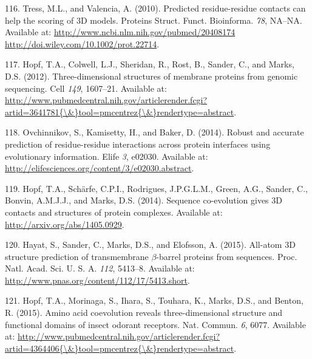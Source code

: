 \documentclass[11pt,a4paper,twoside]{book}
\theoremstyle{definition}
\theoremstyle{definition}
\theoremstyle{remark}
\begin{document}
\hypertarget{ref-Tress2010}{}
116. Tress, M.L., and Valencia, A. (2010). Predicted residue-residue
contacts can help the scoring of 3D models. Proteins Struct. Funct.
Bioinforma. \emph{78}, NA--NA. Available at:
\href{http://www.ncbi.nlm.nih.gov/pubmed/20408174\%20http://doi.wiley.com/10.1002/prot.22714}{http://www.ncbi.nlm.nih.gov/pubmed/20408174 http://doi.wiley.com/10.1002/prot.22714}.

\hypertarget{ref-Hopf2012}{}
117. Hopf, T.A., Colwell, L.J., Sheridan, R., Rost, B., Sander, C., and
Marks, D.S. (2012). Three-dimensional structures of membrane proteins
from genomic sequencing. Cell \emph{149}, 1607--21. Available at:
\href{http://www.pubmedcentral.nih.gov/articlerender.fcgi?artid=3641781\%7B/\&\%7Dtool=pmcentrez\%7B/\&\%7Drendertype=abstract}{http://www.pubmedcentral.nih.gov/articlerender.fcgi?artid=3641781\{\textbackslash{}\&\}tool=pmcentrez\{\textbackslash{}\&\}rendertype=abstract}.

\hypertarget{ref-Ovchinnikov2014a}{}
118. Ovchinnikov, S., Kamisetty, H., and Baker, D. (2014). Robust and
accurate prediction of residue-residue interactions across protein
interfaces using evolutionary information. Elife \emph{3}, e02030.
Available at: \url{http://elifesciences.org/content/3/e02030.abstract}.

\hypertarget{ref-Hopf2014}{}
119. Hopf, T.A., Schärfe, C.P.I., Rodrigues, J.P.G.L.M., Green, A.G.,
Sander, C., Bonvin, A.M.J.J., and Marks, D.S. (2014). Sequence
co-evolution gives 3D contacts and structures of protein complexes.
Available at: \url{http://arxiv.org/abs/1405.0929}.

\hypertarget{ref-Hayat2015a}{}
120. Hayat, S., Sander, C., Marks, D.S., and Elofsson, A. (2015).
All-atom 3D structure prediction of transmembrane \(\beta\)-barrel
proteins from sequences. Proc. Natl. Acad. Sci. U. S. A. \emph{112},
5413--8. Available at:
\url{http://www.pnas.org/content/112/17/5413.short}.

\hypertarget{ref-Hopf2015a}{}
121. Hopf, T.A., Morinaga, S., Ihara, S., Touhara, K., Marks, D.S., and
Benton, R. (2015). Amino acid coevolution reveals three-dimensional
structure and functional domains of insect odorant receptors. Nat.
Commun. \emph{6}, 6077. Available at:
\href{http://www.pubmedcentral.nih.gov/articlerender.fcgi?artid=4364406\%7B/\&\%7Dtool=pmcentrez\%7B/\&\%7Drendertype=abstract}{http://www.pubmedcentral.nih.gov/articlerender.fcgi?artid=4364406\{\textbackslash{}\&\}tool=pmcentrez\{\textbackslash{}\&\}rendertype=abstract}.
\end{document}
